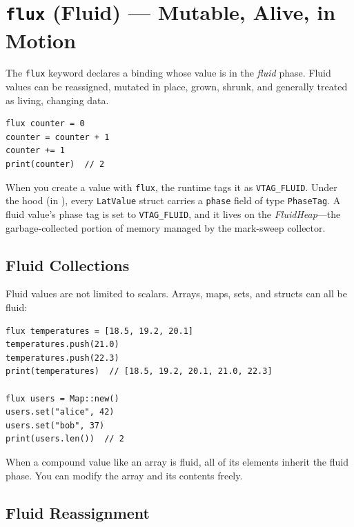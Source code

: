 \section{\texttt{flux} (Fluid) --- Mutable, Alive, in Motion}\label{sec:flux-fluid}


The \lstinline|flux| keyword declares a binding whose value is in the \emph{fluid} phase.
Fluid values can be reassigned, mutated in place, grown, shrunk, and generally treated as living, changing data.

\begin{lstlisting}[language=Lattice, caption={Basic \texttt{flux} usage}]
flux counter = 0
counter = counter + 1
counter += 1
print(counter)  // 2
\end{lstlisting}

When you create a value with \lstinline|flux|, the runtime tags it as \lstinline|VTAG_FLUID|.
Under the hood (in ), every \lstinline|LatValue| struct carries a \lstinline|phase| field of type \lstinline|PhaseTag|.
A fluid value's phase tag is set to \lstinline|VTAG_FLUID|, and it lives on the \emph{FluidHeap}---the garbage-collected portion of memory managed by the mark-sweep collector.

\subsection{Fluid Collections}

Fluid values are not limited to scalars.
Arrays, maps, sets, and structs can all be fluid:

\begin{lstlisting}[language=Lattice, caption={Fluid collections}]
flux temperatures = [18.5, 19.2, 20.1]
temperatures.push(21.0)
temperatures.push(22.3)
print(temperatures)  // [18.5, 19.2, 20.1, 21.0, 22.3]

flux users = Map::new()
users.set("alice", 42)
users.set("bob", 37)
print(users.len())  // 2
\end{lstlisting}

When a compound value like an array is fluid, all of its elements inherit the fluid phase.
You can modify the array and its contents freely.

\subsection{Fluid Reassignment}

